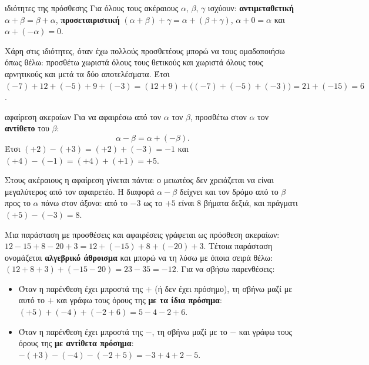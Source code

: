 \begin{idiotita}{ιδιότητες της πρόσθεσης}
Για όλους τους ακέραιους $\alpha,\,\beta,\,\gamma$ ισχύουν: \textbf{αντιμεταθετική} $\alpha+\beta=\beta+\alpha$, \textbf{προσεταιριστική} $(\alpha+\beta)+\gamma=\alpha+(\beta+\gamma)$, $\alpha+0=\alpha$ και $\alpha+(-\alpha)=0$.
\end{idiotita}

Χάρη στις ιδιότητες, όταν έχω πολλούς προσθετέους μπορώ να τους ομαδοποιήσω όπως θέλω: προσθέτω χωριστά όλους τους θετικούς και χωριστά όλους τους αρνητικούς και μετά τα δύο αποτελέσματα. Έτσι $(-7)+12+(-5)+9+(-3)=(12+9)+\big((-7)+(-5)+(-3)\big)=21+(-15)=6$.


\begin{kanonas}{αφαίρεση ακεραίων}
Για να αφαιρέσω από τον $\alpha$ τον $\beta$, προσθέτω στον $\alpha$ τον \textbf{αντίθετο} του $\beta$: $$\alpha-\beta=\alpha+(-\beta).$$ Έτσι $(+2)-(+3)=(+2)+(-3)=-1$ και $(+4)-(-1)=(+4)+(+1)=+5$.
\end{kanonas}

Στους ακέραιους η αφαίρεση γίνεται πάντα: ο μειωτέος δεν χρειάζεται να είναι μεγαλύτερος από τον αφαιρετέο. Η διαφορά $\alpha-\beta$ δείχνει και τον δρόμο από το $\beta$ προς το $\alpha$ πάνω στον άξονα: από το $-3$ ως το $+5$ είναι $8$ βήματα δεξιά, και πράγματι $(+5)-(-3)=8$.


Μια παράσταση με προσθέσεις και αφαιρέσεις γράφεται ως πρόσθεση ακεραίων: $12-15+8-20+3=12+(-15)+8+(-20)+3$. Τέτοια παράσταση ονομάζεται \textbf{αλγεβρικό άθροισμα} και μπορώ να τη λύσω με όποια σειρά θέλω: $(12+8+3)+(-15-20)=23-35=-12$. Για να σβήσω παρενθέσεις:
\begin{itemize}[leftmargin=1.2em,itemsep=0.3ex,topsep=2pt]
\item Όταν η παρένθεση έχει μπροστά της $+$ (ή δεν έχει πρόσημο), τη σβήνω μαζί με αυτό το $+$ και γράφω τους όρους της \textbf{με τα ίδια πρόσημα}: $(+5)+(-4)+(-2+6)=5-4-2+6$.
\item Όταν η παρένθεση έχει μπροστά της $-$, τη σβήνω μαζί με το $-$ και γράφω τους όρους της \textbf{με αντίθετα πρόσημα}: $-(+3)-(-4)-(-2+5)=-3+4+2-5$.
\end{itemize}

